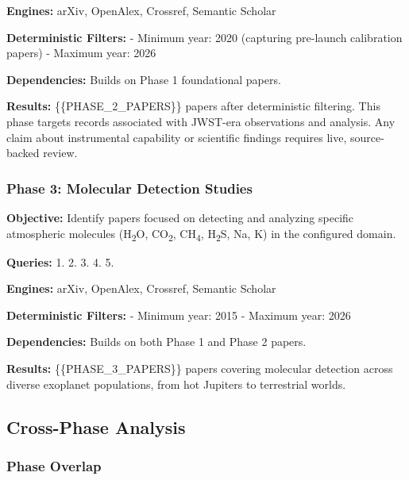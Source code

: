 \documentclass[
]{article}
\begin{document}
\textbf{Engines:} arXiv, OpenAlex, Crossref, Semantic Scholar

\textbf{Deterministic Filters:} - Minimum year: 2020 (capturing
pre-launch calibration papers) - Maximum year: 2026

\textbf{Dependencies:} Builds on Phase 1 foundational papers.

\textbf{Results:} \{\{PHASE\_2\_PAPERS\}\} papers after deterministic
filtering. This phase targets records associated with JWST-era
observations and analysis. Any claim about instrumental capability or
scientific findings requires live, source-backed review.

\subsubsection{Phase 3: Molecular Detection
Studies}\label{phase-3-molecular-detection-studies}

\textbf{Objective:} Identify papers focused on detecting and analyzing
specific atmospheric molecules (H\texorpdfstring{\textsubscript{2}}{2}O, CO\texorpdfstring{\textsubscript{2}}{2}, CH\texorpdfstring{\textsubscript{4}}{4}, H\texorpdfstring{\textsubscript{2}}{2}S, Na, K) in the
configured domain.

\textbf{Queries:} 1.
2.
3. 
4.  5.

\textbf{Engines:} arXiv, OpenAlex, Crossref, Semantic Scholar

\textbf{Deterministic Filters:} - Minimum year: 2015 - Maximum year:
2026

\textbf{Dependencies:} Builds on both Phase 1 and Phase 2 papers.

\textbf{Results:} \{\{PHASE\_3\_PAPERS\}\} papers covering molecular
detection across diverse exoplanet populations, from hot Jupiters to
terrestrial worlds.

\subsection{Cross-Phase Analysis}\label{cross-phase-analysis}

\subsubsection{Phase Overlap}\label{phase-overlap}
\end{document}
